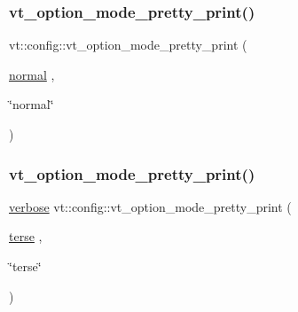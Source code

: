 \mbox{\label{namespacevt_1_1config_a2a62a5b19196c78acd0a1ae882296057}} 
\subsubsection{\texorpdfstring{vt\+\_\+option\+\_\+mode\+\_\+pretty\+\_\+print()}{vt\_option\_mode\_pretty\_print()}\hspace{0.1cm}{\footnotesize\ttfamily [1/4]}}
{\footnotesize\ttfamily vt\+::config\+::vt\+\_\+option\+\_\+mode\+\_\+pretty\+\_\+print (\begin{DoxyParamCaption}\item[{\hyperlink{namespacevt_1_1config_a724e99568632cc0fe9c456c2230270d0a6865573ccc58716514eb9a164a52c256}{normal}}]{,  }\item[{\char`\"{}normal\char`\"{}}]{ }\end{DoxyParamCaption})}

\mbox{\label{namespacevt_1_1config_a27d37fa57b668370f31aa98379f15fa1}} 
\subsubsection{\texorpdfstring{vt\+\_\+option\+\_\+mode\+\_\+pretty\+\_\+print()}{vt\_option\_mode\_pretty\_print()}\hspace{0.1cm}{\footnotesize\ttfamily [2/4]}}
{\footnotesize\ttfamily \hyperlink{namespacevt_1_1config_a724e99568632cc0fe9c456c2230270d0a9b54bf70f7b7fe7cfb6f3da0e167ae27}{verbose} vt\+::config\+::vt\+\_\+option\+\_\+mode\+\_\+pretty\+\_\+print (\begin{DoxyParamCaption}\item[{\hyperlink{namespacevt_1_1config_a724e99568632cc0fe9c456c2230270d0ada56a0a2b6334204a249f398bdf1c794}{terse}}]{,  }\item[{\char`\"{}terse\char`\"{}}]{ }\end{DoxyParamCaption})}

